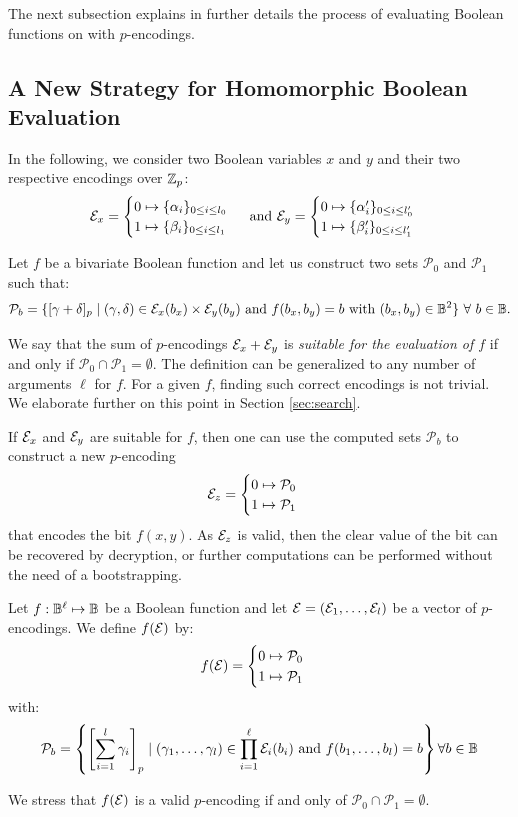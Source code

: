 The next subsection explains in further details the process of evaluating Boolean functions on with $p$-encodings.



\subsection{A New Strategy for Homomorphic Boolean Evaluation}
\label{sec:p_encodings_new_strategy}



In the following, we consider two Boolean variables $x$ and $y$ and their two respective encodings over $\mathbb{Z}_p$: 
\begin{equation}
\mathcal{E}_x = 
\begin{cases} 0 \mapsto \{\alpha_i\}_{0 \le i \le l_0} \\ 1 \mapsto \{\beta_i\}_{0 \le i \le l_1} \end{cases} \text{ and } \mathcal{E}_y = \begin{cases} 0 \mapsto \{\alpha'_i\}_{0 \le i \le l'_0} \\ 1 \mapsto \{\beta'_i\}_{0 \le i \le l'_1} \end{cases}
\label{eq:encoding_definition}
\end{equation}


Let $f$ be a bivariate Boolean function and let us construct two sets $\mathcal{P}_0$ and $\mathcal{P}_1$ such that:
\begin{equation}
    \mathcal{P}_b = \{[\gamma + \delta]_p \mid (\gamma, \delta) \in \mathcal{E}_x(b_x) \times \mathcal{E}_y(b_y) \text{ and } f(b_x, b_y) = b \text{ with } (b_x, b_y) \in \mathbb{B}^2\}~\forall~b \in \mathbb{B}.
    \label{def:sets_p}
\end{equation}

We say that the sum of $p$-encodings $\mathcal{E}_x + \mathcal{E}_y$ is \emph{suitable for the evaluation of $f$} if and only if $\mathcal{P}_0 \cap \mathcal{P}_1 = \emptyset$. The definition can be generalized to any number of arguments $\ell$ for $f$. For a given $f$, finding such correct encodings is not trivial. We elaborate further on this point in Section \ref{sec:search}. 

If $\mathcal{E}_x$ and $\mathcal{E}_y$ are suitable for $f$, then one can use the computed sets $\mathcal{P}_b$ to construct a new $p$-encoding \[\mathcal{E}_z = \begin{cases} 0 \mapsto \mathcal{P}_0 \\ 1 \mapsto \mathcal{P}_1 \end{cases}\] that encodes the bit $f(x, y)$. As $\mathcal{E}_z$ is valid, then the clear value of the bit can be recovered by decryption, or further computations can be performed without the need of a bootstrapping. 


\begin{definition}
    Let $f:\mathbb{B}^\ell \mapsto \mathbb{B}$ be a Boolean function and let $\mathcal{E} = (\mathcal{E}_1, \dots, \mathcal{E}_l)$ be a vector of $p$-encodings. We define $f(\mathcal{E})$ by:
    \[f(\mathcal{E}) = \begin{cases} 0 \mapsto \mathcal{P}_0 \\ 1 \mapsto \mathcal{P}_1 \end{cases}\]
    with: 
    \[\mathcal{P}_b = \left \{ \left [ \sum_{i=1}^{l} \gamma_i \right ]_p \mid (\gamma_1, \dots, \gamma_l) \in \prod_{i=1}^\ell \mathcal{E}_i(b_i) \text{ and } f(b_1, \dots, b_l) = b \right \} \forall b \in \mathbb{B}\]

We stress that $f(\mathcal{E})$ is a valid $p$-encoding if and only of $\mathcal{P}_0 \cap \mathcal{P}_1 = \emptyset$.
\end{definition}


